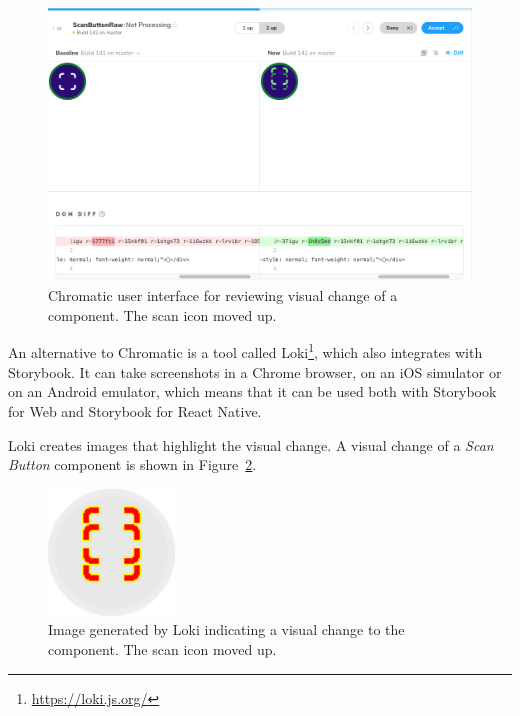 \documentclass[
  digital, %
  table,   %
  oneside, %
  lof,     %
  lot,     %
]{fithesis3}
\begin{document}
\begin{figure}
    \begin{center}
        \includegraphics[width=\textwidth]{figures/other/chromatic_diff}
    \end{center}
    \caption{Chromatic user interface for reviewing visual change of a component. The scan icon moved up.}
    \label{fig:chromatic_diff}
\end{figure}

An alternative to Chromatic is a tool called Loki\footnote{\url{https://loki.js.org/}}, which also integrates with Storybook. It can take screenshots in a Chrome browser, on an iOS simulator or on an Android emulator, which means that it can be used both with Storybook for Web and Storybook for React Native.

Loki creates images that highlight the visual change. A visual change of a \textit{Scan Button} component is shown in Figure~\ref{fig:loki_diff}.

\begin{figure}
    \begin{center}
        \includegraphics[width=0.3\textwidth]{figures/other/loki_diff}
    \end{center}
    \caption{Image generated by Loki indicating a visual change to the component. The scan icon moved up.}
    \label{fig:loki_diff}
\end{figure}
\end{document}
